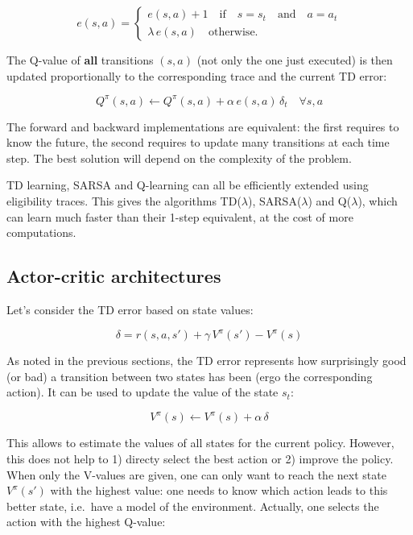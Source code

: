 \documentclass[
  letterpaper,
  DIV=11,
  numbers=noendperiod]{scrreprt}
\begin{document}
\[
    e(s, a) = \begin{cases} e(s, a) + 1 \quad \text{if} \quad s=s_t \quad \text{and} \quad a=a_t \\
                            \lambda \, e(s, a) \quad \text{otherwise.}
              \end{cases}
\]

The Q-value of \textbf{all} transitions \((s, a)\) (not only the one
just executed) is then updated proportionally to the corresponding trace
and the current TD error:

\[
    Q^\pi(s, a) \leftarrow  Q^\pi(s, a) + \alpha \, e(s, a) \, \delta_{t} \quad \forall s, a
\]

The forward and backward implementations are equivalent: the first
requires to know the future, the second requires to update many
transitions at each time step. The best solution will depend on the
complexity of the problem.

TD learning, SARSA and Q-learning can all be efficiently extended using
eligibility traces. This gives the algorithms TD(\(\lambda\)),
SARSA(\(\lambda\)) and Q(\(\lambda\)), which can learn much faster than
their 1-step equivalent, at the cost of more computations.

\hypertarget{actor-critic-architectures}{%
\subsection{Actor-critic
architectures}\label{actor-critic-architectures}}

Let's consider the TD error based on state values:

\[
 \delta = r(s, a, s') + \gamma \, V^\pi(s') - V^\pi(s)
\]

As noted in the previous sections, the TD error represents how
surprisingly good (or bad) a transition between two states has been
(ergo the corresponding action). It can be used to update the value of
the state \(s_t\):

\[
    V^\pi(s) \leftarrow V^\pi(s) + \alpha \, \delta
\]

This allows to estimate the values of all states for the current policy.
However, this does not help to 1) directy select the best action or 2)
improve the policy. When only the V-values are given, one can only want
to reach the next state \(V^\pi(s')\) with the highest value: one needs
to know which action leads to this better state, i.e.~have a model of
the environment. Actually, one selects the action with the highest
Q-value:
\end{document}
